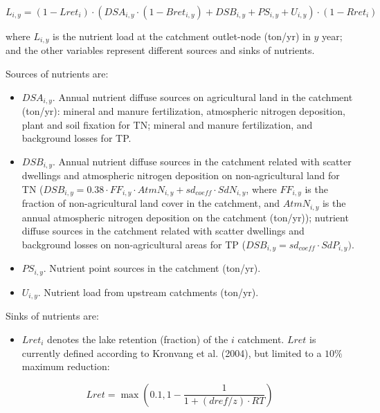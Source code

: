 \begin{equation}
  L_{i,y} = (1-Lret_i) \cdot (DSA_{i,y} \cdot (1-Bret_{i,y} )+ DSB_{i,y} + PS_{i,y} +U_{i,y} ) \cdot (1-Rret_i) 
\label{eq:green-nutrient-load}
\end{equation}

\noindent where \(L_{i,y}\) is the nutrient load at the catchment outlet-node (ton/yr) in \(y\) year; and the other variables represent different sources and sinks of nutrients.

Sources of nutrients are:

\begin{itemize}
\item
  \(DSA_{i,y}\). Annual nutrient diffuse sources on agricultural land in the catchment (ton/yr): mineral and manure fertilization, atmospheric nitrogen deposition, plant and soil fixation for TN; mineral and manure fertilization, and background losses for TP.
\item
  \(DSB_{i,y}\). Annual nutrient diffuse sources in the catchment related with scatter dwellings and atmospheric nitrogen deposition on non-agricultural land for TN (\(DSB_{i,y} = 0.38 \cdot FF_{i,y} \cdot AtmN_{i,y} + sd_{coeff} \cdot SdN_{i,y}\), where \(FF_{i,y}\) is the fraction of non-agricultural land cover in the catchment, and \(AtmN_{i,y}\) is the annual atmospheric nitrogen deposition on the catchment (ton/yr)); nutrient diffuse sources in the catchment related with scatter dwellings and background losses on non-agricultural areas for TP (\(DSB_{i,y} = sd_{coeff} \cdot SdP_{i,y})\).
\item
  \(PS_{i,y}\). Nutrient point sources in the catchment (ton/yr).
\item
  \(U_{i,y}\). Nutrient load from upstream catchments (ton/yr).
\end{itemize}

\noindent Sinks of nutrients are:

\begin{itemize}
\tightlist
\item
  \(Lret_i\) denotes the lake retention (fraction) of the \(i\) catchment. \(Lret\) is currently defined according to Kronvang et al. (2004), but limited to a \(10\%\) maximum reduction:
\end{itemize}

\begin{equation}
    Lret = \max\left(0.1, 1 - \frac{1}{1 + (dref / z) \cdot RT}  \right)
    \label{eq:lake-retention}
  \end{equation}

